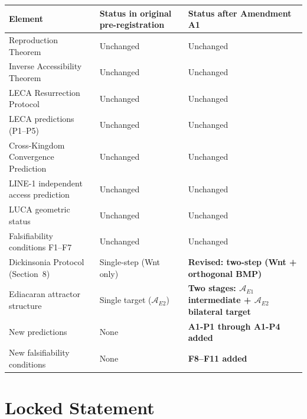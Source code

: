 \documentclass[12pt, a4paper]{article}
\theoremstyle{definition}
\theoremstyle{remark}
\begin{document}
\begin{center}
\begin{tabularx}{\textwidth}{lXX}
\toprule
\textbf{Element} &
\textbf{Status in original pre-registration} &
\textbf{Status after Amendment A1} \\
\midrule
Reproduction Theorem
  & Unchanged & Unchanged \\
Inverse Accessibility Theorem
  & Unchanged & Unchanged \\
LECA Resurrection Protocol
  & Unchanged & Unchanged \\
LECA predictions (P1--P5)
  & Unchanged & Unchanged \\
Cross-Kingdom Convergence Prediction
  & Unchanged & Unchanged \\
LINE-1 independent access prediction
  & Unchanged & Unchanged \\
LUCA geometric status
  & Unchanged & Unchanged \\
Falsifiability conditions F1--F7
  & Unchanged & Unchanged \\
\midrule
Dickinsonia Protocol (Section~8)
  & Single-step (Wnt only)
  & \textbf{Revised: two-step (Wnt + orthogonal BMP)} \\
Ediacaran attractor structure
  & Single target ($\mathcal{A}_{E2}$)
  & \textbf{Two stages: $\mathcal{A}_{E1}$ intermediate
    + $\mathcal{A}_{E2}$ bilateral target} \\
New predictions
  & None
  & \textbf{A1-P1 through A1-P4 added} \\
New falsifiability conditions
  & None
  & \textbf{F8--F11 added} \\
\bottomrule
\end{tabularx}
\end{center}

\section{Locked Statement}
\end{document}
